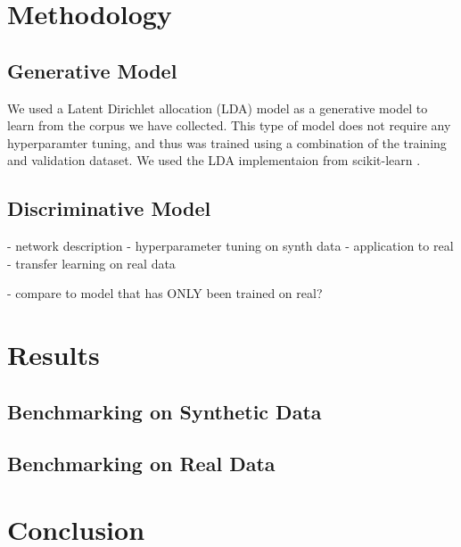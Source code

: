 \documentclass[11pt]{article}
\begin{document}
\section{Methodology}

\subsection{Generative Model}
We used a Latent Dirichlet allocation (LDA) model as a generative model to learn from the corpus we have collected. This type of model does not require any hyperparamter tuning, and thus was trained using a combination of the training and validation dataset. We used the LDA implementaion from scikit-learn \cite{sklearn}. 


\subsection{Discriminative Model}
- network description
- hyperparameter tuning on synth data
- application to real
- transfer learning on real data

- compare to model that has ONLY been trained on real?

\section{Results}
\subsection{Benchmarking on Synthetic Data}

\begin{center}
%	
\end{center}


\subsection{Benchmarking on Real Data}

\section{Conclusion}
\end{document}
